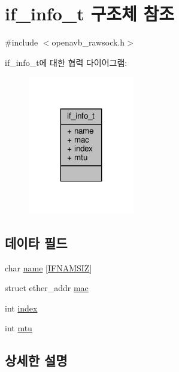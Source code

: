 \hypertarget{structif__info__t}{}\section{if\+\_\+info\+\_\+t 구조체 참조}
\label{structif__info__t}


{\ttfamily \#include $<$openavb\+\_\+rawsock.\+h$>$}



if\+\_\+info\+\_\+t에 대한 협력 다이어그램\+:
\nopagebreak
\begin{figure}[H]
\begin{center}
\leavevmode
\includegraphics[width=131pt]{structif__info__t__coll__graph}
\end{center}
\end{figure}
\subsection*{데이타 필드}
\begin{DoxyCompactItemize}
\item 
char \hyperlink{structif__info__t_a9ea12d6fc5b2c586092468ee1a86162a}{name} \mbox{[}\hyperlink{tl_2openavb__tl__pub_8h_acd06da230a96d3b7e6f193c5b3142002}{I\+F\+N\+A\+M\+S\+IZ}\mbox{]}
\item 
struct ether\+\_\+addr \hyperlink{structif__info__t_a42d8b5e2d1a2c12771953cdf097f7173}{mac}
\item 
int \hyperlink{structif__info__t_a750b5d744c39a06bfb13e6eb010e35d0}{index}
\item 
int \hyperlink{structif__info__t_a5f8594e356005c64e4a2625755b6c849}{mtu}
\end{DoxyCompactItemize}


\subsection{상세한 설명}


